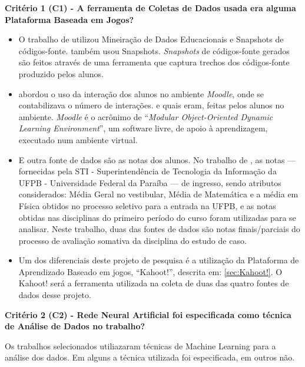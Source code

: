 \documentclass[
	12pt,				%
	openright,			%
	oneside,
	a4paper,			%
	english,			%
	french,				%
	spanish,			%
	brazil,				%
	]{abntex2}
\begin{document}
\textbf{Critério 1 (C1) - A ferramenta de Coletas de Dados usada era alguma Plataforma Baseada em Jogos?}

\begin{itemize}
    \item O trabalho de  utilizou Mineiração de Dados Educacionais e Snapshots de códigos-fonte.  também usou Snapshots. \textit{Snapshots} de códigos-fonte gerados são feitos através de uma ferramenta que captura trechos dos códigos-fonte produzido pelos alunos.
    \item {} abordou o uso da interação dos alunos no ambiente \textit{Moodle}, onde se contabilizava o número de interações. e quais eram, feitas pelos alunos no ambiente. \textit{Moodle} é o acrônimo de ``\textit{Modular Object-Oriented Dynamic Learning Environment}'', um software livre, de apoio à aprendizagem, executado num ambiente virtual.
    \item E outra fonte de dados são as notas dos alunos. No trabalho de , as notas --- fornecidas pela STI - Superintendência de Tecnologia da Informação da UFPB - Universidade Federal da Paraíba --- de ingresso, sendo atributos considerados: Média Geral no vestibular, Média de Matemática e a média em Física obtidos no processo seletivo para a entrada na UFPB, e as notas obtidas nas disciplinas do primeiro período do curso foram utilizadas para se analisar. Neste trabalho, duas das fontes de dados são notas finais/parciais do processo de avaliação somativa da disciplina do estudo de caso.
    \item Um dos diferenciais deste projeto de pesquisa é a utilização da Plataforma de Aprendizado Baseado em jogos, ``Kahoot!'', descrita em: \ref{sec:Kahoot!}. O Kahoot! será a ferramenta utilizada na coleta de duas das quatro fontes de dados desse projeto.
\end{itemize}


\textbf{Critério 2 (C2) - Rede Neural Artificial foi especificada como técnica de Análise de Dados no trabalho?}

Os trabalhos selecionados utiliazaram técnicas de Machine Learning para a análise dos dados. Em alguns a técnica utilizada foi especificada, em outros não.
\end{document}
